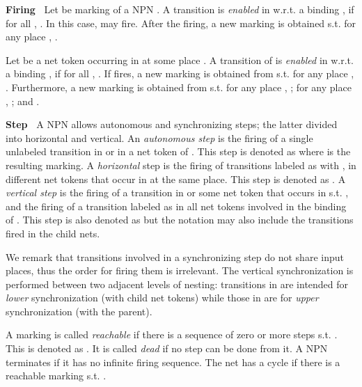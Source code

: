 \documentclass{llncs}
\begin{document}
\noindent\textbf{Firing\ }  Let  be marking of a NPN . A transition  is \emph{enabled} in  w.r.t. a binding , if for all , . In this case,   may fire. After the firing, a new marking  is obtained s.t. for any place , .

Let  be a net token occurring in  at some place . A transition  of  is \emph{enabled} in  w.r.t. a binding , if for all , . If  fires, a new marking  is obtained from  s.t. for any place , . Furthermore, a new marking  is obtained from  s.t. for any place , ; for any place , ; and .


\noindent\textbf{Step\ } A NPN allows autonomous and synchronizing steps; the latter divided into horizontal and vertical. An \emph{autonomous step} is the firing of a single unlabeled transition in  or in a net token of . This step is denoted as  where  is the resulting marking.  A \emph{horizontal} step is the firing of  transitions labeled as  with , in  different net tokens that occur in  at the same place. This step is denoted as . A \emph{vertical step} is the firing of a transition  in  or some net token that occurs in  s.t. , and the firing of a transition labeled as  in all net tokens involved in the binding of . This step is also denoted as  but the notation may also include the transitions fired in the child nets.


We remark that transitions involved in a synchronizing step do not share input places, thus the order for firing them is irrelevant. The vertical synchronization is performed between two adjacent levels of nesting: transitions in  are intended for \emph{lower} synchronization (with child net tokens) while those in  are for \emph{upper} synchronization (with the parent). 


A marking  is called \emph{reachable} if there is a sequence of zero or more steps   s.t. . This is denoted as . It is called \emph{dead} if no step can be done from it.  A NPN terminates if it has no infinite firing sequence.  The net has a cycle if there is a reachable marking  s.t. .
\end{document}
